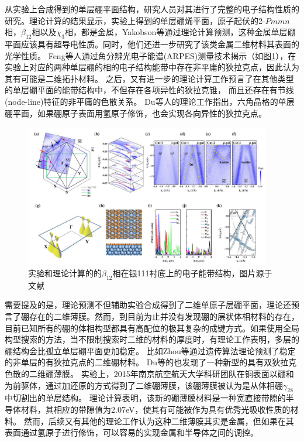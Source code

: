 从实验上合成得到的单层硼平面结构，研究人员对其进行了完整的电子结构性质的研究。理论计算的结果显示，实验上得到的单层硼烯平面，原子起伏的2-$Pmmn$相，$\beta_{12}$相以及$\chi_3$相，都是金属\cite{shu2016unveiling}，Yakobson等\cite{penev2016can}通过理论计算预测，这种金属单层硼平面应该具有超导电性质。同时，他们还进一步研究了该类金属二维材料其表面的光学性质\cite{huang2017two}。
Feng等\cite{feng2017dirac,feng2018discovery}人通过角分辨光电子能谱(ARPES)测量技术揭示（如图\ref{fig:ch1_boron_arpes}），在实验上对应的两种单层硼的相的电子结构能带中存在非平庸的狄拉克点，因此认为其有可能是二维拓扑材料。
之后，又有进一步的理论计算工作预言了在其他类型的单层硼平面的能带结构中，不但存在各项异性的狄拉克锥， 而且还存在有节线(node-line)特征的非平庸的色散关系\cite{zhang2017dirac}。
Du等\cite{jiao2016two}人的理论工作指出，六角晶格的单层硼平面，如果硼原子表面用氢原子修饰，也会实现各向异性的狄拉克点。

\begin{figure}
  \includegraphics[width=0.96\textwidth]{figs/ch1_boron_arpes.png}
  \centering
  \caption{实验和理论计算的的$\beta_{12}$相在银111衬底上的电子能带结构，图片源于文献\cite{feng2017dirac}}
  \label{fig:ch1_boron_arpes}
\end{figure}

需要提及的是，理论预测不但辅助实验合成得到了二维单原子层硼平面，理论还预言了硼存在的二维薄膜。然而，到目前为止并没有发现硼的层状体相材料的存在，目前已知所有的硼的体相构型都具有高配位的极其复杂的成键方式。如果使用全局构型搜索的方法，当不限制搜索时二维的材料的厚度时，有理论工作表明，多层的硼结构会比孤立单层硼平面更加稳定。
比如Zhou等\cite{zhou2014semimetallic}通过遗传算法理论预测了稳定的非单层的有狄拉克点的二维硼材料。
Du等\cite{ma2016graphene}的也发现了一种新型的具有双狄拉克色散的二维硼薄膜。
实验上，2015年南京航空航天大学科研团队在铜表面以硼和为前驱体，通过加还原的方式得到了二维硼薄膜\cite{tai2015synthesis}，该硼薄膜被认为是从体相硼$\gamma_{28}$中切割出的单层结构。
理论计算表明，该新的硼薄膜材料是一种宽直接带隙的半导体材料，其相应的带隙值为2.07eV，使其有可能被作为具有优秀光吸收性质的材料。
然而，后续又有其他的理论工作\cite{kou2016high}认为这种二维薄膜其实是金属，但如果在其表面通过氢原子进行修饰，可以容易的实现金属和半导体之间的调控。


